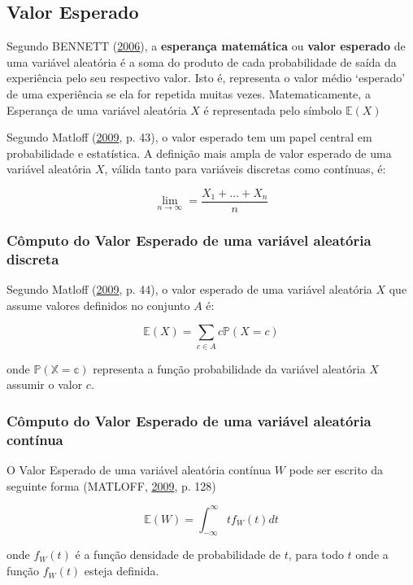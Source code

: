 \documentclass[a4paper, 12pt]{article}
\begin{document}
\subsection{Valor Esperado}\label{valor-esperado}

Segundo BENNETT (\protect\hyperlink{ref-bennett}{2006}), a
\textbf{esperança matemática} ou \textbf{valor esperado } de uma
variável aleatória é a soma do produto de cada probabilidade de saída da
experiência pelo seu respectivo valor. Isto é, representa o valor médio
`esperado' de uma experiência se ela for repetida muitas vezes.
Matematicamente, a Esperança de uma variável aleatória \(X\) é
representada pelo símbolo \(\mathbb{E}(X)\)

Segundo Matloff (\protect\hyperlink{ref-matloff2009}{2009}, p. 43), o
valor esperado tem um papel central em probabilidade e estatística. A
definição mais ampla de valor esperado de uma variável aleatória \(X\),
válida tanto para variáveis discretas como contínuas, é:

\[\lim_{n \to \infty} = \frac{X_1 + \ldots + X_n}{n}\]

\subsubsection{Cômputo do Valor Esperado de uma variável aleatória
discreta}\label{computo-do-valor-esperado-de-uma-variavel-aleatoria-discreta}

Segundo Matloff (\protect\hyperlink{ref-matloff2009}{2009}, p. 44), o
valor esperado de uma variável aleatória \(X\) que assume valores
definidos no conjunto \(A\) é:

\[\mathbb{E}(X) = \sum_{c \in A}c\mathbb{P}(X=c)\]

onde \(\mathbb{P(X = c)}\) representa a função probabilidade da variável
aleatória \(X\) assumir o valor \(c\).

\subsubsection{Cômputo do Valor Esperado de uma variável aleatória
contínua}\label{computo-do-valor-esperado-de-uma-variavel-aleatoria-continua}

O Valor Esperado de uma variável aleatória contínua \(W\) pode ser
escrito da seguinte forma (MATLOFF,
\protect\hyperlink{ref-matloff2009}{2009}, p. 128)

\[\mathbb{E}(W) = \int_{-\infty}^{\infty}tf_W(t)dt\]

onde \(f_W(t)\) é a função densidade de probabilidade de \(t\), para
todo \(t\) onde a função \(f_W(t)\) esteja definida.
\end{document}
